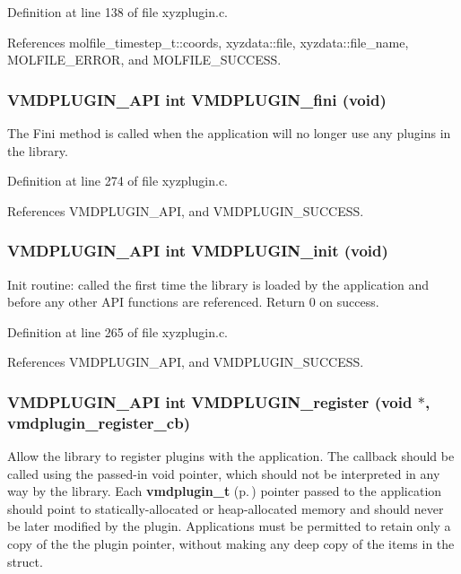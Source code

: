 Definition at line 138 of file xyzplugin.c.

References molfile\_\-timestep\_\-t::coords, xyzdata::file, xyzdata::file\_\-name, MOLFILE\_\-ERROR, and MOLFILE\_\-SUCCESS.
\subsubsection{\setlength{\rightskip}{0pt plus 5cm}VMDPLUGIN\_\-API int VMDPLUGIN\_\-fini (void)}\label{xyzplugin_8c_a11}


The Fini method is called when the application will no longer use  any plugins in the library. 

Definition at line 274 of file xyzplugin.c.

References VMDPLUGIN\_\-API, and VMDPLUGIN\_\-SUCCESS.
\subsubsection{\setlength{\rightskip}{0pt plus 5cm}VMDPLUGIN\_\-API int VMDPLUGIN\_\-init (void)}\label{xyzplugin_8c_a9}


Init routine: called the first time the library is loaded by the  application and before any other API functions are referenced. Return 0 on success. 

Definition at line 265 of file xyzplugin.c.

References VMDPLUGIN\_\-API, and VMDPLUGIN\_\-SUCCESS.
\subsubsection{\setlength{\rightskip}{0pt plus 5cm}VMDPLUGIN\_\-API int VMDPLUGIN\_\-register (void $\ast$, {\bf vmdplugin\_\-register\_\-cb})}\label{xyzplugin_8c_a10}


Allow the library to register plugins with the application. The callback should be called using the passed-in void pointer, which should not be interpreted in any way by the library. Each {\bf vmdplugin\_\-t} {\rm (p.\,\pageref{structvmdplugin__t})} pointer passed to the application should point to statically-allocated or heap-allocated memory and should never be later modified by the plugin. Applications must be permitted to retain only a copy of the the plugin pointer, without making any deep copy of the items in the struct. 

